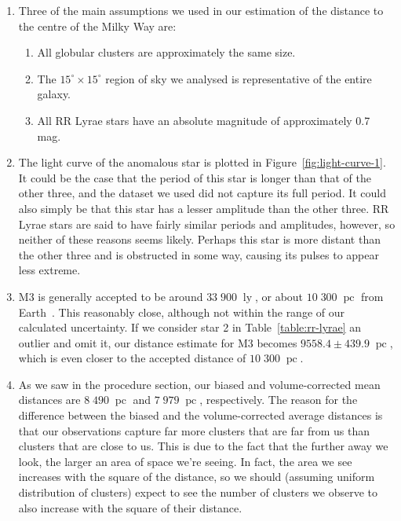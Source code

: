 \documentclass[11pt]{article}
\DeclareMathOperator{\ly}{ly}
\DeclareMathOperator{\pc}{pc}
\begin{document}
\begin{enumerate}[label={\textbf{\emph{(\arabic*)}}}]
	\item %
Three of the main assumptions we used in our estimation of the distance to the centre of the Milky Way are:
\begin{enumerate}[label={\arabic*.}]
	\item All globular clusters are approximately the same size.
	\item The $15^\circ \times 15^\circ$ region of sky we analysed is representative of the entire galaxy.
	\item All RR Lyrae stars have an absolute magnitude of approximately 0.7 mag.
\end{enumerate}

	\item %
The light curve of the anomalous star is plotted in Figure~\ref{fig:light-curve-1}.
It could be the case that the period of this star is longer than that of the other three, and the dataset we used did not capture its full period.
It could also simply be that this star has a lesser amplitude than the other three.
RR Lyrae stars are said to have fairly similar periods and amplitudes, however, so neither of these reasons seems likely.
Perhaps this star is more distant than the other three and is obstructed in some way, causing its pulses to appear less extreme.

	\item %
M3 is generally accepted to be around $33\;900\;\ly$, or about $10\;300\;\pc$ from Earth~\cite{m3-dist}.
This reasonably close, although not within the range of our calculated uncertainty.
If we consider star 2 in Table~\ref{table:rr-lyrae} an outlier and omit it, our distance estimate for M3 becomes $9558.4 \pm 439.9\;\pc$, which is even closer to the accepted distance of $10\;300\;\pc$.

	\item %
As we saw in the procedure section, our biased and volume-corrected mean distances are $8\;490\;\pc$ and $7\;979\;\pc$, respectively.
The reason for the difference between the biased and the volume-corrected average distances is that our observations capture far more clusters that are far from us than clusters that are close to us.
This is due to the fact that the further away we look, the larger an area of space we're seeing.
In fact, the area we see increases with the square of the distance, so we should (assuming uniform distribution of clusters) expect to see the number of clusters we observe to also increase with the square of their distance.


\end{enumerate}
\end{document}
